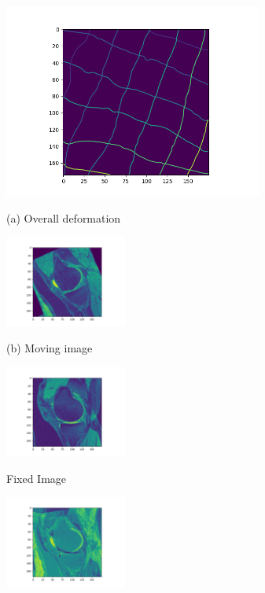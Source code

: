 \documentclass{article}
\begin{document}
\begin{figure}[htb]

\begin{minipage}[b]{1.0\linewidth}
  \centering
  \centerline{\includegraphics[width=8.5cm]{knee_affine-31/003_.png}}
  \centerline{(a) Overall deformation}\medskip
\end{minipage}
%
\begin{minipage}[b]{.48\linewidth}
  \centering
  \centerline{\includegraphics[width=4.0cm]{knee_affine-31/006_.png}}
  \centerline{(b) Moving image}\medskip
\end{minipage}
\hfill
\begin{minipage}[b]{0.48\linewidth}
  \centering
  \centerline{\includegraphics[width=4.0cm]{knee_affine-31/007_.png}}
  \centerline{Fixed Image}\medskip
\end{minipage}
%
\begin{minipage}[b]{.48\linewidth}
  \centering
  \centerline{\includegraphics[width=4.0cm]{knee_affine-31/004_.png}}

\end{minipage}
\end{figure}
\end{document}
